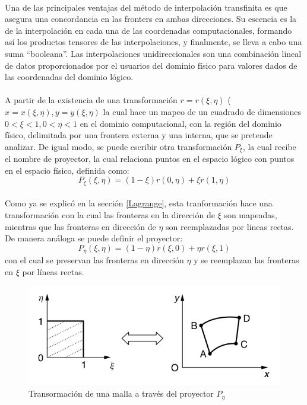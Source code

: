 \documentclass[letterpaper, openright, 12pt]{book}
\begin{document}
			\paragraph*{}
				Una de las principales ventajas del método de interpolación transfinita es que asegura una concordancia en las fronters en ambas direcciones. Su escencia es la de la interpolación en cada una de las coordenadas computacionales, formando así los productos tensores de las interpolaciones, y finalmente, se lleva a cabo una suma ``booleana''. Las interpolaciones unidireccionales son una combinación lineal de datos proporcionados por el usuarios del dominio físico para valores dados de las coordenadas del dominio lógico.
			\paragraph*{}
				A partir de la existencia de una transformación $r = r(\xi, \eta)$ ($x = x(\xi, \eta), y = y(\xi, \eta)$ la cual hace un mapeo de un cuadrado de dimensiones $0 < \xi < 1, 0 < \eta < 1$ en el dominio computacional, con la región del dominio físico, delimitada por una frontera externa y una interna, que se pretende analizar. De igual modo, se puede escribir otra transformación $P_{\xi}$, la cual recibe el nombre de proyector, la cual relaciona puntos en el espacio lógico con puntos en el espacio físico, definida como:
				\begin{equation}
					P_{\xi}(\xi, \eta) = (1 - \xi)r(0, \eta) + \xi r(1, \eta)
				\end{equation}
			\paragraph*{}
				Como ya se explicó en la sección \ref{Lagrange}, esta tranformación hace una transformación con la cual las fronteras en la dirección de $\xi$ son mapeadas, mientras que las fronteras en dirección de $\eta$ son reemplazadas por lineas rectas. De manera análoga se puede definir el proyector:
				\begin{equation}
					P_{\eta}(\xi, \eta) = (1 - \eta)r(\xi, 0) + \eta r(\xi, 1)
				\end{equation}
				con el cual se preservan las fronteras en dirección $\eta$ y se reemplazan las fronteras en $\xi$ por líneas rectas.
			\begin{figure}[htbp!]
				\centering
				\includegraphics[width=120mm]{./Imagenes/mapeo_eta}
				\caption[Transformación de malla por $P_{\eta}$]{Transormación de una malla a través del proyector $P_{\eta}$ \cite{farrashkhalvat}}
				\label{fig:mapeo_eta}
			\end{figure}
\end{document}
